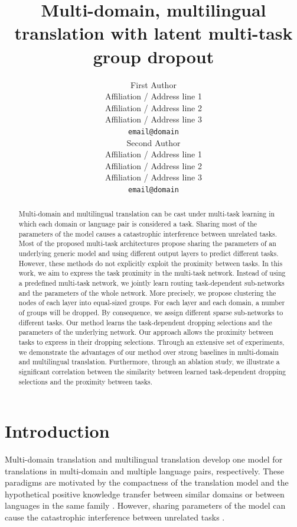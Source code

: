 \documentclass[11pt]{article}
\title{Multi-domain, multilingual translation with latent multi-task group dropout}
\author{First Author \\
  Affiliation / Address line 1 \\
  Affiliation / Address line 2 \\
  Affiliation / Address line 3 \\
  \texttt{email@domain} \\\And
  Second Author \\
  Affiliation / Address line 1 \\
  Affiliation / Address line 2 \\
  Affiliation / Address line 3 \\
  \texttt{email@domain} \\}
\begin{document}
\setlength{\parskip}{0pt}
\setlength{\abovedisplayskip}{0pt}
\setlength{\belowdisplayskip}{0pt}
\setlength{\abovedisplayshortskip}{0pt}
\setlength{\belowdisplayshortskip}{0pt}
\maketitle
\begin{abstract}
Multi-domain and multilingual translation can be cast under multi-task learning in which each domain or language pair is considered a task. Sharing most of the parameters of the model causes a catastrophic interference between unrelated tasks. Most of the proposed multi-task architectures propose sharing the parameters of an underlying generic model and using different output layers to predict different tasks. However, these methods do not explicitly exploit the proximity between tasks. In this work, we aim to express the task proximity in the multi-task network. Instead of using a predefined multi-task network, we jointly learn routing task-dependent sub-networks and the parameters of the whole network. More precisely, we propose clustering the nodes of each layer into equal-sized groups. For each layer and each domain, a number of groups will be dropped. By consequence, we assign different sparse sub-networks to different tasks. Our method learns the task-dependent dropping selections and the parameters of the underlying network. Our approach allows the proximity between tasks to express in their dropping selections. Through an extensive set of experiments, we demonstrate the advantages of our method over strong baselines in multi-domain and multilingual translation. Furthermore, through an ablation study, we illustrate a significant correlation between the similarity between learned task-dependent dropping selections and the proximity between tasks.
\end{abstract}

\section{Introduction}
Multi-domain translation and multilingual translation develop one model for translations in multi-domain and multiple language pairs, respectively. These paradigms are motivated by the compactness of the translation model \cite{dabre20survey,Chu18multilingual} and the hypothetical positive knowledge transfer between similar domains \citep{Pham21revisiting} or between languages in the same family \citep{Tan19multilingual}. However, sharing parameters of the model can cause the catastrophic interference between unrelated tasks \citep{conneau20unsupervised,wang20negative}.
\end{document}
